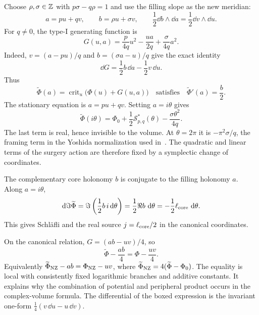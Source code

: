 Choose $\rho,\sigma\in\mathbb Z$ with $p\sigma-q\rho=1$ and use
the filling slope as the new meridian:
\begin{equation}
 a=pu+qv,\qquad b=\rho u+\sigma v,\qquad
 \frac12\dd b\wedge\dd a=\frac12\dd v\wedge\dd u.
 \label{eq:NZcanonicalfilling}
\end{equation}
For $q\ne0$, the type-I generating function is
\begin{equation}
 \boxed{G(u,a)=\frac{p}{4q}u^2-\frac{ua}{2q}
                         +\frac{\sigma}{4q}a^2.}
 \label{eq:NZcanonicalkernel}
\end{equation}
Indeed, $v=(a-pu)/q$ and $b=(\sigma a-u)/q$ give the exact identity
\begin{equation}
 \dd G=\frac12b\,\dd a-\frac12v\,\dd u.
 \label{eq:NZgeneratingidentity}
\end{equation}
Thus
\[
 \widetilde\Phi(a)=\operatorname{crit}_u\bigl(\Phi(u)+G(u,a)\bigr)
 \quad\text{satisfies}\quad
 \widetilde\Phi'(a)=\frac b2.
\]
The stationary equation is $a=pu+qv$. Setting $a=i\theta$ gives
\begin{equation}
 \widetilde\Phi(i\theta)
 =\Phi_0+\frac12\mathcal S^*_{p,q}(\theta)
          -\frac{\sigma\theta^2}{4q}.
 \label{eq:NZcanonicalaction}
\end{equation}
The last term is real, hence invisible to the volume. At
$\theta=2\pi$ it is $-\pi^2\sigma/q$, the framing term in
the Yoshida normalization used in~\cite[p.~456, formula preceding (5.9)]{WongYangDehn}.
The quadratic and linear terms of the surgery action are therefore
fixed by a symplectic change of coordinates.

The complementary core holonomy $b$ is conjugate to the filling
holonomy $a$. Along $a=i\theta$,
\[
 \mathop{}\!\mathrm d\Im\widetilde\Phi
   =\Im\left(\frac12b\,i\mathop{}\!\mathrm d\theta\right)
   =\frac12\Re b\,\mathop{}\!\mathrm d\theta
   =-\frac12\ell_{\rm core}\,\mathop{}\!\mathrm d\theta.
\]
This gives Schl\"afli and the real source
$j=\ell_{\rm core}/2$ in the canonical coordinates.

On the canonical relation, $G=(ab-uv)/4$, so
\begin{equation}
 \boxed{\widetilde\Phi-\frac{ab}{4}
                  =\Phi-\frac{uv}{4}.}
 \label{eq:NZinvariantpotential}
\end{equation}
Equivalently $\widetilde\Phi_{\rm NZ}-ab=\Phi_{\rm NZ}-uv$,
where $\widetilde\Phi_{\rm NZ}=4(\widetilde\Phi-\Phi_0)$.
The equality is local with consistently fixed logarithmic branches
and additive constants. It explains why the combination of potential
and peripheral product occurs in the complex-volume formula.
The differential of the boxed expression is the invariant one-form
$\tfrac14(v\,\dd u-u\,\dd v)$.

